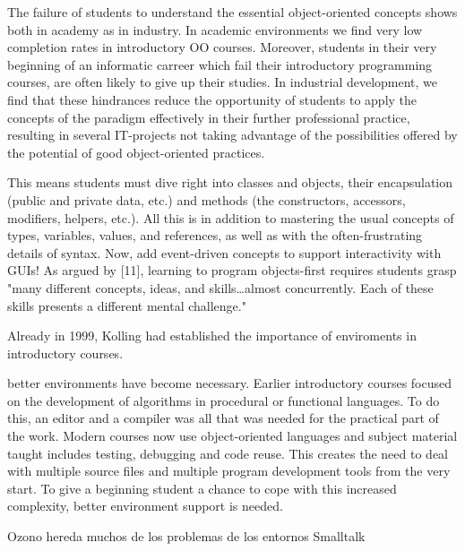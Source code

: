 \documentclass[preprint,10pt]{sigplanconf}
\begin{document}
The failure of students to understand the essential object-oriented concepts shows both in academy as in industry.
In academic environments we find very low completion rates in introductory OO courses.
Moreover, students in their very beginning of an informatic carreer which fail their introductory programming courses, are often likely to give up their studies.
In industrial development, we find that these hindrances reduce the opportunity of students to apply
the concepts of the paradigm effectively in their further
professional practice, resulting in several IT-projects not taking
advantage of the possibilities offered by the potential of good
object-oriented practices. \cite{lombardi_instances_2007}

This means students must dive
right into classes and objects, their encapsulation (public
and private data, etc.) and methods (the constructors,
accessors, modifiers, helpers, etc.). All this is in addition to
mastering the usual concepts of types, variables, values, and
references, as well as with the often-frustrating details of
syntax. Now, add event-driven concepts to support
interactivity with GUIs! As argued by [11], learning to
program objects-first requires students grasp "many
different concepts, ideas, and skills…almost concurrently.
Each of these skills presents a different mental challenge." \cite{cooper_teaching_2003}


Already in 1999, Kolling \etal had established the importance of enviroments in introductory courses\cite{kolling_problem_1999}. 

better environments have become necessary. Earlier introductory courses
focused on the development of algorithms in procedural or functional languages. To
do this, an editor and a compiler was all that was needed for the practical part of the
work. Modern courses now use object-oriented languages and subject material
taught includes testing, debugging and code reuse. This creates the need to deal with
multiple source files and multiple program development tools from the very start. To
give a beginning student a chance to cope with this increased complexity, better
environment support is needed\cite{kolling_problem_1999}. 

Ozono hereda muchos de los problemas de los entornos Smalltalk
\end{document}
